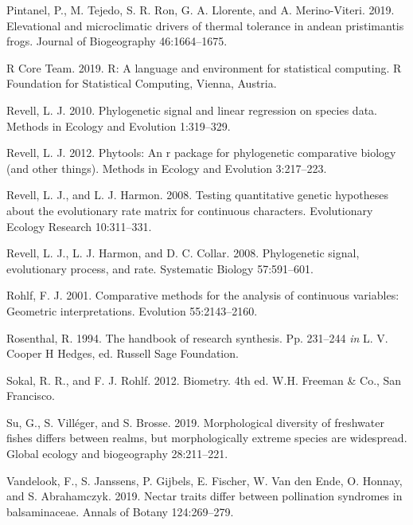 \documentclass[
]{article}
\begin{document}
\leavevmode\hypertarget{ref-Pintanel2019}{}%
Pintanel, P., M. Tejedo, S. R. Ron, G. A. Llorente, and A.
Merino-Viteri. 2019. Elevational and microclimatic drivers of thermal
tolerance in andean pristimantis frogs. Journal of Biogeography
46:1664--1675.

\leavevmode\hypertarget{ref-RCT}{}%
R Core Team. 2019. R: A language and environment for statistical
computing. R Foundation for Statistical Computing, Vienna, Austria.

\leavevmode\hypertarget{ref-Revell2010}{}%
Revell, L. J. 2010. Phylogenetic signal and linear regression on species
data. Methods in Ecology and Evolution 1:319--329.

\leavevmode\hypertarget{ref-Revell2012}{}%
Revell, L. J. 2012. Phytools: An r package for phylogenetic comparative
biology (and other things). Methods in Ecology and Evolution 3:217--223.

\leavevmode\hypertarget{ref-RevellHarmon2008}{}%
Revell, L. J., and L. J. Harmon. 2008. Testing quantitative genetic
hypotheses about the evolutionary rate matrix for continuous characters.
Evolutionary Ecology Research 10:311--331.

\leavevmode\hypertarget{ref-Revell_et_al2008}{}%
Revell, L. J., L. J. Harmon, and D. C. Collar. 2008. Phylogenetic
signal, evolutionary process, and rate. Systematic Biology 57:591--601.

\leavevmode\hypertarget{ref-Rohlf2001}{}%
Rohlf, F. J. 2001. Comparative methods for the analysis of continuous
variables: Geometric interpretations. Evolution 55:2143--2160.

\leavevmode\hypertarget{ref-Rosenthal1994}{}%
Rosenthal, R. 1994. The handbook of research synthesis. Pp. 231--244
\emph{in} L. V. Cooper H Hedges, ed. Russell Sage Foundation.

\leavevmode\hypertarget{ref-SokalRohlf2012}{}%
Sokal, R. R., and F. J. Rohlf. 2012. Biometry. 4th ed. W.H. Freeman \&
Co., San Francisco.

\leavevmode\hypertarget{ref-Su2019}{}%
Su, G., S. Villéger, and S. Brosse. 2019. Morphological diversity of
freshwater fishes differs between realms, but morphologically extreme
species are widespread. Global ecology and biogeography 28:211--221.

\leavevmode\hypertarget{ref-Vandelook2019}{}%
Vandelook, F., S. Janssens, P. Gijbels, E. Fischer, W. Van den Ende, O.
Honnay, and S. Abrahamczyk. 2019. Nectar traits differ between
pollination syndromes in balsaminaceae. Annals of Botany 124:269--279.
\end{document}
